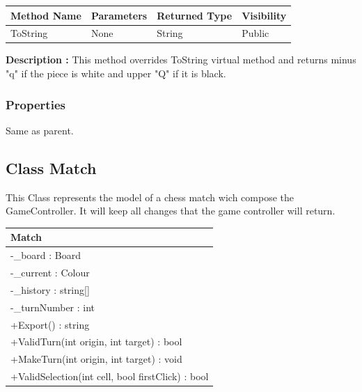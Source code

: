 \documentclass[12pt]{article}
\begin{document}
\begin{table}[H]
    \begin{tabular}{|l|l|l|l|}
    \hline
    \rowcolor[HTML]{EFEFEF} 
    \cellcolor[HTML]{EFEFEF}\textbf{Method Name} & \textbf{Parameters}  & \textbf{Returned Type} & \textbf{Visibility} \\ \hline
    ToString                                   & None                 & String                   & Public              \\ \hline
    \end{tabular}
\end{table}

\textbf{Description :} This method overrides ToString virtual
method and returns minus "q" if the piece is white and upper "Q"
if it is black.

\subsubsection{Properties}

Same as parent.

\newpage


\subsection{Class Match}

This Class represents the model of a chess match wich compose the
GameController. It will keep all changes that the game controller will return.

\begin{table}[H]
    \begin{tabular}{|l|}
    \hline
    \rowcolor[HTML]{C0C0C0} 
    \textbf{Match}                                    \\ \hline
    \rowcolor[HTML]{EFEFEF} 
    -\_board : Board                                  \\ \hline
    \rowcolor[HTML]{EFEFEF} 
    -\_current : Colour                               \\ \hline
    \rowcolor[HTML]{EFEFEF} 
    -\_history : string{[}{]}                         \\ \hline
    \rowcolor[HTML]{EFEFEF} 
    -\_turnNumber : int                               \\ \hline
    +Export() : string                                \\ \hline
    +ValidTurn(int origin, int target) : bool         \\ \hline
    +MakeTurn(int origin, int target) : void          \\ \hline
    +ValidSelection(int cell, bool firstClick) : bool \\ \hline
    \end{tabular}
\end{table}
\end{document}
